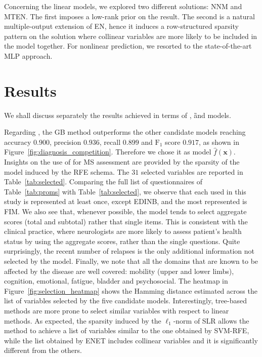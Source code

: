 Concerning the linear models, we explored two different solutions: NNM and MTEN. The first imposes a low-rank prior on the result. The second is a natural multiple-output extension of EN, hence it induces a row-structured sparsity pattern on the solution where collinear variables are more likely to be included in the model together. For nonlinear prediction, we resorted to the state-of-the-art MLP approach.

\section{Results}\label{sec:results}

We shall discuss separately the results achieved in terms of \F, \G and \FOG models.

Regarding \F, the GB method outperforms the other candidate models reaching accuracy $0.900$, precision $0.936$, recall $0.899$ and $\text{F}_1$ score $0.917$, as shown in Figure~\ref{fig:diagnosis_competition}. Therefore we chose it as \F model $\hat{f}(\bm{x})$.
Insights on the use of \PCOs for MS assessment are provided by the sparsity of the \F model induced by the RFE schema.
The $31$ selected variables are reported in Table~\ref{tab:selected}.
Comparing the full list of \PCO questionnaires of Table~\ref{tab:proms} with Table~\ref{tab:selected}, we observe that each \PCO used in this study is represented at least once, except EDINB, and the most represented is FIM.
We also see that, whenever possible, the model tends to select aggregate scores (total and subtotal) rather that single items. This is consistent with the clinical practice, where neurologists are more likely to assess patient's health status by using the aggregate scores, rather than the single questions.
Quite surprisingly, the recent number of relapses is the only additional information not selected by the model.
Finally, we note that all the domains that are known to be affected by the disease are well covered: mobility (upper and lower limbs), cognition, emotional, fatigue, bladder and psychosocial.
The heatmap in Figure~\ref{fig:selection_heatmap} shows the Hamming distance estimated across the list of variables selected by the five \F candidate models. Interestingly, tree-based methods are more prone to select similar variables with respect to linear methods. As expected, the sparsity induced by the $\ell_1$-norm of SLR allows the method to achieve a list of variables similar to the one obtained by SVM-RFE, while the list obtained by ENET includes collinear variables and it is significantly different from the others.

